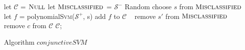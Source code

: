 \begin{algorithm}[!h]
\SetAlgoVlined
\Indm
{}
\Indp
    let $\mathcal{C}$ = $\textsc{Null}$\;
    let $\textsc{Misclassified}$ = $\mathcal{S}^-$\;
     {
        Random choose $s$ from $\textsc{Misclassified}$\;
        let $f$ = polynomial\textsc{Svm}($\mathcal{S}^+$, s)\;
        add $f$ to $\mathcal{C}$\;
         {\
             {
                remove $s'$ from $\textsc{Misclassified}$\;
            }
        }
     {
         {
            remove $c$ from $\mathcal{C}$\;
        }
    }
    }
    \Return $\mathcal{C}$;
\caption{Algorithm $conjunctiveSVM$}
\label{alg:conjunctiveSVM}
\end{algorithm}






